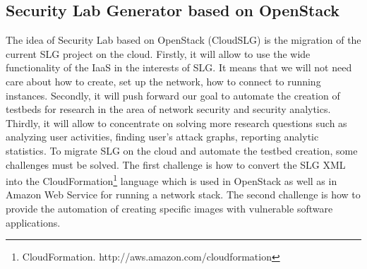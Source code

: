 \subsection{Security Lab Generator based on OpenStack}
The idea of Security Lab based on OpenStack (CloudSLG) is the migration of the current SLG project on the cloud. Firstly, it will allow to use the wide functionality of the IaaS in the interests of SLG. It means that we will not need care about how to create, set up the network, how to connect to running instances. Secondly, it will push forward our goal to automate the creation of testbeds for research in the area of network security and security analytics. Thirdly, it will allow to concentrate on solving more research questions such as analyzing user activities, finding user's attack graphs, reporting analytic statistics. To migrate SLG on the cloud and automate the testbed creation, some challenges must be solved. The first challenge is how to convert the SLG XML into the CloudFormation\footnote{CloudFormation. http://aws.amazon.com/cloudformation} language which is used in OpenStack as well as in Amazon Web Service for running a network stack. The second challenge is how to provide the automation of creating specific images with vulnerable software applications.



% 